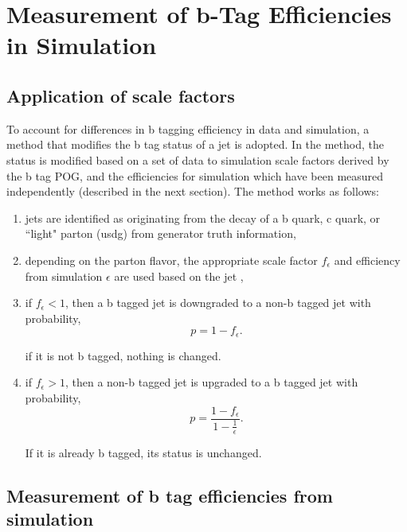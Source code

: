 \section{Measurement of b-Tag Efficiencies in Simulation}
\label{sec:app:btag}


\subsection{Application of scale factors}


To account for differences in b tagging efficiency in data and 
simulation, a method that modifies the b tag status of a jet is adopted.
In the method, the status is modified based on a set of data to
simulation scale factors derived by the b tag POG, and the efficiencies
for simulation which have been measured independently (described in the
next section).  The method works as follows:

\begin{enumerate}
    \item jets are identified as originating from the decay of a b
    quark, c quark, or ``light" parton (usdg) from generator truth information,
    
    \item depending on the parton flavor, the appropriate scale factor $f_{\epsilon}$ 
    and efficiency from simulation $\epsilon$ are used
    based on the jet \pt,
    
    \item if $f_{\epsilon} < 1$, then a b tagged jet is downgraded to a
    non-b tagged jet with probability,
    \begin{equation}
        p = 1 - f_{\epsilon}.
    \end{equation}

    \noindent if it is not b tagged, nothing is changed.
    
    
    \item if $f_{\epsilon} > 1$, then a non-b tagged jet is upgraded to
    a b tagged jet with probability,
    \begin{equation}
        p = \frac{1 - f_{\epsilon}}{1 - \frac{1}{\epsilon}}.
    \end{equation}

    \noindent If it is already b  tagged, its status is unchanged.
\end{enumerate}

\subsection{Measurement of b tag efficiencies from simulation}

